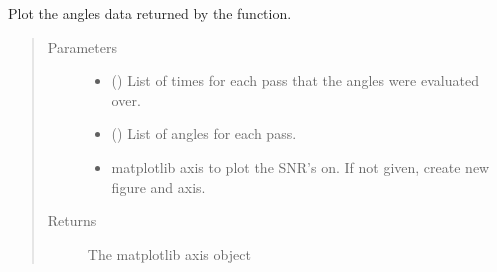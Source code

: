\documentclass[letterpaper,10pt,english]{sphinxmanual}
\begin{document}
\begin{fulllineitems}
\label{\detokenize{modules/simulate_tracking:simulate_tracking.plot_angles}}
Plot the angles data returned by the {\hyperref[\detokenize{modules/simulate_tracking:simulate_tracking.get_angles}]{}} function.
\begin{quote}\begin{description}
\item[{Parameters}] \leavevmode\begin{itemize}
\item {} 
 () \textendash{} List of times for each pass that the angles were evaluated over.

\item {} 
 () \textendash{} List of angles for each pass.

\item {} 
 \textendash{} matplotlib axis to plot the SNR’s on. If not given, create new figure and axis.

\end{itemize}

\item[{Returns}] \leavevmode
The matplotlib axis object

\end{description}\end{quote}

\end{fulllineitems}

\end{document}

